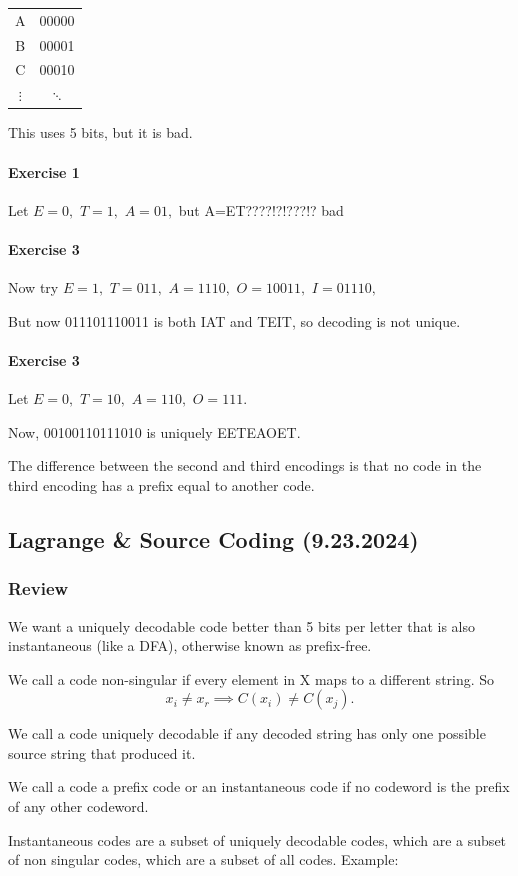 \documentclass[12pt]{article}
\begin{document}
\begin{tabular}{c c}
    A&00000\\
    B&00001\\
    C&00010\\
    $\vdots$&$\ddots$
\end{tabular}


This uses 5 bits, but it is bad.
\paragraph{Exercise 1}
Let $E=0,$ $T=1,$ $A=01,$ but A=ET????!?!???!?
bad
\paragraph{Exercise 3}
Now try
$E=1,$ $T=011,$ $A=1110,$ $O=10011,$ $I=01110,$

But now
011101110011 is both IAT and TEIT, so decoding is not unique.
\paragraph{Exercise 3}
Let $E=0,$ $T=10,$ $A=110,$ $O=111.$

Now, 00100110111010 is uniquely EETEAOET.

The difference between the second and third encodings is that no code in the third encoding has a prefix equal to another code.

\subsection{Lagrange \& Source Coding (9.23.2024)}
\subsubsection{Review}
We want a uniquely decodable code better than 5 bits per letter that is also instantaneous (like a DFA), otherwise known as prefix-free. 



We call a code non-singular if every element in X maps to a different string. So
\[x_i\ne x_r\implies C(x_i)\ne C(x_j).\]

We call a code uniquely decodable if any decoded string has only one possible source string that produced it.

We call a code a prefix code or an instantaneous code if no codeword is the prefix of any other codeword. 

Instantaneous codes are a subset of uniquely decodable codes, which are a subset of non singular codes, which are a subset of all codes.
Example:
\end{document}
